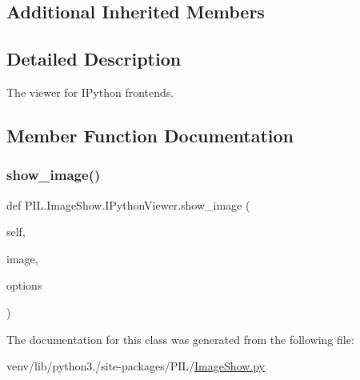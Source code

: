 \subsection*{Additional Inherited Members}


\subsection{Detailed Description}
\begin{DoxyVerb}The viewer for IPython frontends.\end{DoxyVerb}
 

\subsection{Member Function Documentation}
\mbox{\label{classPIL_1_1ImageShow_1_1IPythonViewer_a31b522985952ff1333b5fdd20d8fc92d}} 
\subsubsection{\texorpdfstring{show\+\_\+image()}{show\_image()}}
{\footnotesize\ttfamily def P\+I\+L.\+Image\+Show.\+I\+Python\+Viewer.\+show\+\_\+image (\begin{DoxyParamCaption}\item[{}]{self,  }\item[{}]{image,  }\item[{}]{options }\end{DoxyParamCaption})}



The documentation for this class was generated from the following file\+:\begin{DoxyCompactItemize}
\item 
venv/lib/python3./site-\/packages/\+P\+I\+L/\hyperlink{ImageShow_8py}{Image\+Show.\+py}\end{DoxyCompactItemize}
